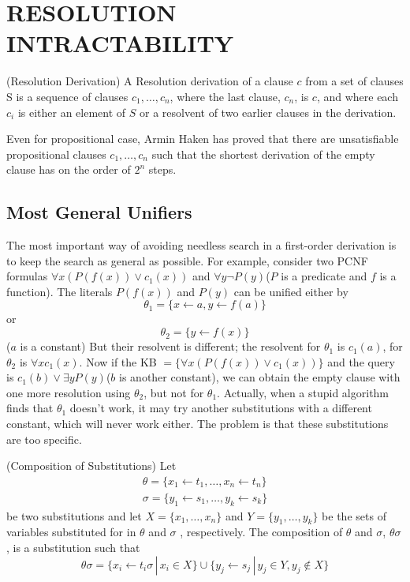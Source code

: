 \documentclass{article}
\begin{document}
\section{RESOLUTION INTRACTABILITY}
\begin{defin}(Resolution Derivation)\newline
A Resolution derivation of a clause $c$ from a set of clauses$ $S is a sequence of clauses $c_1, \dots, c_n$, where the last clause, $c_n$, is $c$, and where each $c_i$ is either an element of $S$ or a resolvent of two earlier clauses in the derivation. 
\end{defin}

Even for propositional case, Armin Haken has proved that there are unsatisfiable propositional clauses $c_1,\dots,c_n$ such that the shortest derivation of the empty clause has on the order of $2^n$ steps. 

\subsection{Most General Unifiers}
The most important way of avoiding needless search in a first-order derivation is to keep the search as general as possible. For example, consider two PCNF formulas $\forall x (P(f(x)) \vee c_1(x))$ and $\forall y \neg P(y)$($P$ is a predicate and $f$ is a function). The literals $P(f(x))$ and $P(y)$ can be unified either by  
\[
\theta_1 = \{x \leftarrow a, y \leftarrow f(a)\}
\]
or
\[
\theta_2 = \{y \leftarrow f(x)\}
\]($a$ is a constant)\newline
But their resolvent is different; the resolvent for $\theta_1$ is $c_1(a)$, for $\theta_2$ is $\forall xc_1(x)$.  Now if the KB $= \{\forall x (P(f(x)) \vee c_1(x))\}$ and the query is $c_1(b) \vee \exists y P(y)$($b$ is another constant), we can obtain the empty clause with one more resolution using $\theta_2$, but not for $\theta_1$. Actually, when a stupid algorithm finds that $\theta_1$ doesn't work, it may try another substitutions with a different constant, which will never work either. The problem is that these substitutions are too specific.

\begin{defin}(Composition of Substitutions)\newline
Let 
\begin{align*}
\theta = \{x_1 \leftarrow t_1,\dots,x_n \leftarrow t_n\}\\
\sigma = \{y_1 \leftarrow s_1, \dots, y_k \leftarrow s_k\}
\end{align*}
be two substitutions and let $X = \{x_1,\dots,x_n\}$ and $Y = \{y_1,\dots,y_k\}$ be the sets of variables substituted for in $\theta$ and $\sigma$ , respectively. The composition of $\theta$ and $\sigma$, $\theta\sigma$, is a substitution such that
\[
\theta\sigma = \{x_i \leftarrow t_i\sigma\,|\,x_i \in X\} \cup \{y_j \leftarrow s_j\,|\,y_j \in Y, y_j \notin X\}
\]
\end{defin}
\end{document}

